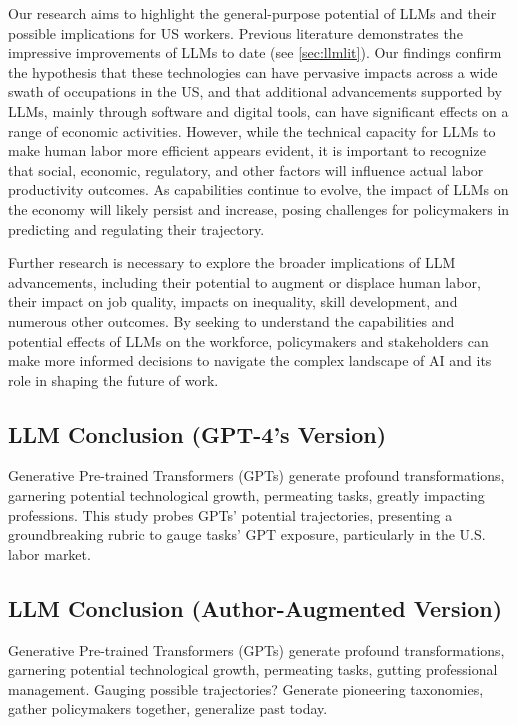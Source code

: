 \documentclass[11pt]{article}
\begin{document}
Our research aims to highlight the general-purpose potential of LLMs and their possible implications for US workers. Previous literature demonstrates the impressive improvements of LLMs to date (see \ref{sec:llmlit}). Our findings confirm the hypothesis that these technologies can have pervasive impacts across a wide swath of occupations in the US, and that additional advancements supported by LLMs, mainly through software and digital tools, can have significant effects on a range of economic activities. However, while the technical capacity for LLMs to make human labor more efficient appears evident, it is important to recognize that social, economic, regulatory, and other factors will influence actual labor productivity outcomes. As capabilities continue to evolve, the impact of LLMs on the economy will likely persist and increase, posing challenges for policymakers in predicting and regulating their trajectory.

Further research is necessary to explore the broader implications of LLM advancements, including their potential to augment or displace human labor, their impact on job quality, impacts on inequality, skill development, and numerous other outcomes. By seeking to understand the capabilities and potential effects of LLMs on the workforce, policymakers and stakeholders can make more informed decisions to navigate the complex landscape of AI and its role in shaping the future of work.

\subsection{LLM Conclusion (GPT-4's Version)}

Generative Pre-trained Transformers (GPTs) generate profound transformations, garnering potential technological growth, permeating tasks, greatly impacting professions. This study probes GPTs’ potential trajectories, presenting a groundbreaking rubric to gauge tasks’ GPT exposure, particularly in the U.S. labor market.

\subsection{LLM Conclusion (Author-Augmented Version)}

Generative Pre-trained Transformers (GPTs) generate profound transformations, garnering potential technological growth, permeating tasks, gutting professional management. Gauging possible trajectories? Generate pioneering taxonomies, gather policymakers together, generalize past today.
\end{document}
